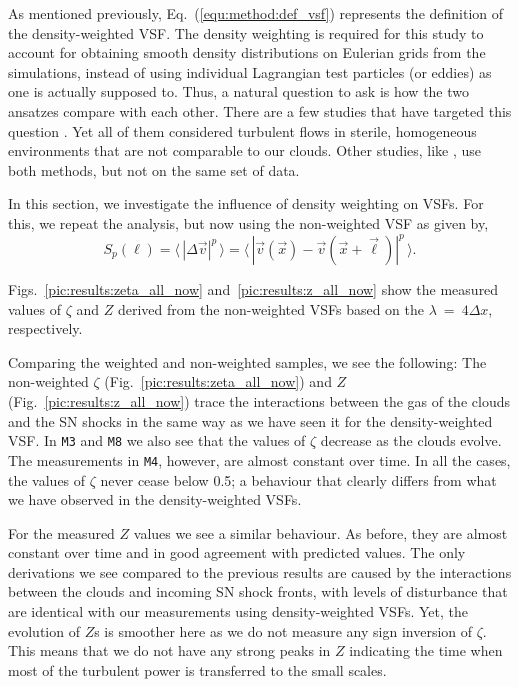 As mentioned previously, Eq.~(\ref{equ:method:def_vsf}) represents the definition of the density-weighted VSF.
The density weighting is required for this study to account for obtaining smooth density distributions on Eulerian grids from the simulations, instead of using individual Lagrangian test particles (or eddies) as one is actually supposed to.
Thus, a natural question to ask is how the two ansatzes compare with each other.
There are a few studies that have targeted this question . 
Yet all of them considered turbulent flows in sterile, homogeneous environments that are not comparable to our clouds.
Other studies, like \citet{Padoan2016a}, use both methods, but not on the same set of data. 

In this section, we investigate the influence of density weighting on VSFs.
For this, we repeat the analysis, but now using the non-weighted VSF as given by,
\begin{equation}
	\mathit{S}_p (\ell) = \langle \, |\Delta \vec{v}|^p  \, \rangle = \langle \, |\vec{v}(\vec{x}) - \vec{v}(\vec{x} + \vec{\ell})|^p  \, \rangle .
    \label{equ:results:def_vsf_no}
\end{equation}

Figs.~\ref{pic:results:zeta_all_now} and~\ref{pic:results:z_all_now} show the measured values of $\zeta$ and $Z$ derived from the non-weighted VSFs based on the $\lambda~=~4\Delta x$, respectively.

Comparing the weighted and non-weighted samples, we see the following:
The non-weighted $\zeta$ (Fig.~\ref{pic:results:zeta_all_now}) and $Z$ (Fig.~\ref{pic:results:z_all_now}) trace the interactions between the gas of the clouds and the SN shocks in the same way as we have seen it for the density-weighted VSF.
In \texttt{M3} and \texttt{M8} we also see that the values of $\zeta$ decrease as the clouds evolve. 
The measurements in \texttt{M4}, however, are almost constant over time. 
In all the cases, the values of $\zeta$ never cease below 0.5; a behaviour that clearly differs from what we have observed in the density-weighted VSFs.

For the measured $Z$ values we see a similar behaviour. 
As before, they are almost constant over time and in good agreement with predicted values.
The only derivations we see compared to the previous results are caused by the interactions between the clouds and incoming SN shock fronts, with levels of disturbance that are identical with our measurements using density-weighted VSFs. 
Yet, the evolution of $Z$s is smoother here as we do not measure any sign inversion of $\zeta$.
This means that we do not have any strong peaks in $Z$ indicating the time when most of the turbulent power is transferred to the small scales. 


